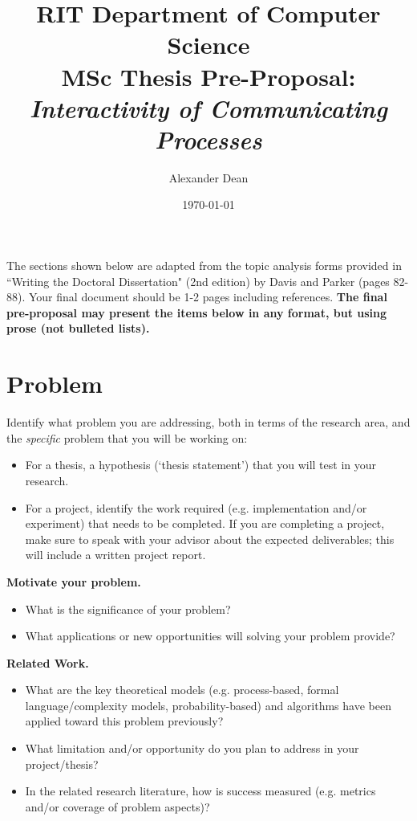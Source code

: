 \documentclass[11pt]{artikel3}
\title{RIT Department of Computer Science\\MSc Thesis Pre-Proposal:\\\emph{Interactivity of Communicating Processes}}
\author{Alexander Dean}
\date{\today}
\begin{document}
\maketitle

The sections shown below are adapted from the topic analysis forms provided in ``Writing the Doctoral Dissertation" (2nd edition) by Davis and Parker (pages 82-88). Your final document should be 1-2 pages including references. {\bf The final pre-proposal may present the items below in any format, but using prose (not bulleted lists).} 

\section{Problem}
Identify what problem you are addressing, both in terms of the research area, and the \emph{specific} problem that you will be working on:
\begin{itemize}
	\item For a thesis, a hypothesis (`thesis statement') that you will test in your research.
	\item For a project, identify the work required (e.g. implementation and/or experiment) that needs to be completed. If you are completing a project, make sure to speak with your advisor about the expected deliverables; this will include a written project report.
\end{itemize}

{\bf Motivate your problem.} 
\begin{itemize}
	\item What is the significance of your problem? 
	\item What applications or new opportunities will solving your problem provide?
\end{itemize}

{\bf Related Work.}
\begin{itemize}
	\item What are the key theoretical models (e.g. process-based, formal language/complexity models, probability-based) and algorithms have been applied toward this problem previously? 
	\item What limitation and/or opportunity do you plan to address in your project/thesis?
	\item
In the related research literature, how is success measured (e.g. metrics and/or coverage of problem aspects)?
\end{itemize}
\end{document}
